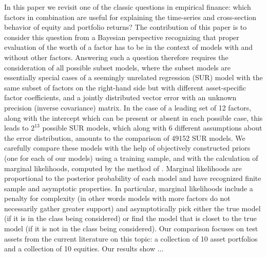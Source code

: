 In this paper we revisit one of the classic questions in empirical finance: which factors in combination are useful for explaining the time-series and cross-section behavior of equity and portfolio returns? 
The contribution of this paper is to consider this question from a Bayesian perspective recognizing that proper evaluation of the worth of a factor has to be in the context of models with and without other factors. 
Answering such a question therefore requires the consideration of all possible subset models, where the subset models are essentially special cases of a seemingly unrelated regression (SUR) model with the same subset of factors on the right-hand side but with different asset-specific factor coefficients, and a jointly distributed vector error with an unknown precision (inverse covariance) matrix. 
In the case of a leading set of 12 factors, along with the intercept which can be present or absent in each possible case, this leads to $2^{13}$ possible SUR models, which along with 6 different assumptions about the error distribution, amounts to the comparison of 49152 SUR models. 
We carefully compare these models with the help of objectively constructed priors (one for each of our models) using a training sample, and with the calculation of marginal likelihoods, computed by the method of \cite{chib1995marginal}. 
Marginal likelihoods are proportional to the posterior probability of each model and have recognized finite sample and asymptotic properties. 
In particular, marginal likelihoods include a penalty for complexity (in other words models with more factors do not necessarily gather greater support) and asymptotically pick either the true model (if it is in the class being considered) or find the model that is closet to the true model (if it is not in the class being considered). 
Our comparison focuses on test assets from the current literature on this topic: a collection of 10 asset portfolios and a collection of 10 equities. Our results show ...
